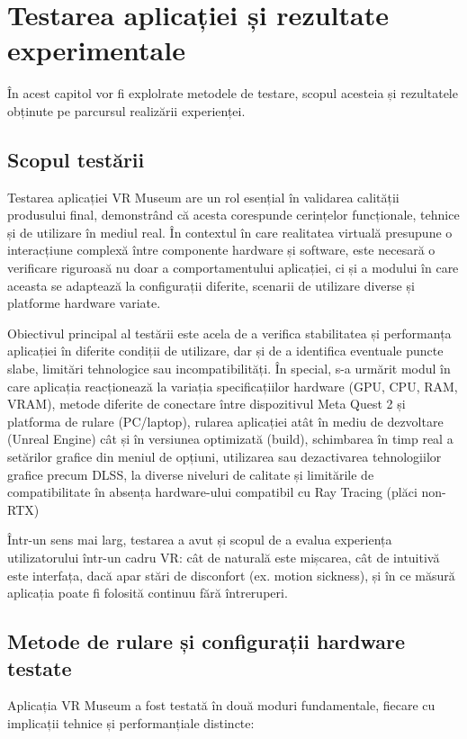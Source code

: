\chapter{Testarea aplicației și rezultate experimentale}
\label{cap:cap4}

În acest capitol vor fi explolrate metodele de testare, scopul acesteia și rezultatele obținute pe parcursul realizării experienței.

\section{Scopul testării}
Testarea aplicației VR Museum are un rol esențial în validarea calității produsului final, demonstrând că acesta corespunde cerințelor funcționale, tehnice și de utilizare în mediul real. În contextul în care realitatea virtuală presupune o interacțiune complexă între componente hardware și software, este necesară o verificare riguroasă nu doar a comportamentului aplicației, ci și a modului în care aceasta se adaptează la configurații diferite, scenarii de utilizare diverse și platforme hardware variate.

Obiectivul principal al testării este acela de a verifica stabilitatea și performanța aplicației în diferite condiții de utilizare, dar și de a identifica eventuale puncte slabe, limitări tehnologice sau incompatibilități. În special, s-a urmărit modul în care aplicația reacționează la variația specificațiilor hardware (GPU, CPU, RAM, VRAM), metode diferite de conectare între dispozitivul Meta Quest 2 și platforma de rulare (PC/laptop), rularea aplicației atât în mediu de dezvoltare (Unreal Engine) cât și în versiunea optimizată (build), schimbarea în timp real a setărilor grafice din meniul de opțiuni, utilizarea sau dezactivarea tehnologiilor grafice precum DLSS, la diverse niveluri de calitate și limitările de compatibilitate în absența hardware-ului compatibil cu Ray Tracing (plăci non-RTX)

Într-un sens mai larg, testarea a avut și scopul de a evalua experiența utilizatorului într-un cadru VR: cât de naturală este mișcarea, cât de intuitivă este interfața, dacă apar stări de disconfort (ex. motion sickness), și în ce măsură aplicația poate fi folosită continuu fără întreruperi.

\section{Metode de rulare și configurații hardware testate}
Aplicația VR Museum a fost testată în două moduri fundamentale, fiecare cu implicații tehnice și performanțiale distincte:

